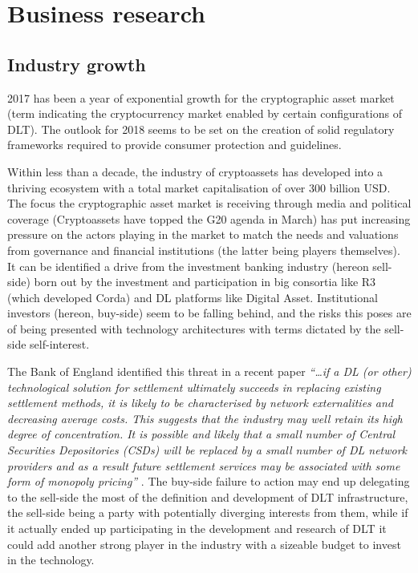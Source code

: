 \chapter{Business research}
\label{chap:business-analysis}

\section{Industry growth}

2017 has been a year of exponential growth for the cryptographic asset market (term indicating the cryptocurrency market enabled by certain configurations of DLT). The outlook for 2018 seems to be set on the creation of solid regulatory frameworks required to provide consumer protection and guidelines.

Within less than a decade, the industry of cryptoassets has developed into a thriving ecosystem with a total market capitalisation of over 300 billion USD.
The focus the cryptographic asset market is receiving through media and political coverage (Cryptoassets have topped the G20 agenda in March) has put increasing pressure on the actors playing in the market to match the needs and valuations from governance and financial institutions (the latter being players themselves).\\

It can be identified a drive from the investment banking industry (hereon sell-side) born out by the investment and participation in big consortia like R3 (which developed Corda) and DL platforms like Digital Asset. Institutional investors (hereon, buy-side) seem to be falling behind, and the risks this poses are of being presented with technology architectures with terms dictated by the sell-side self-interest.

The Bank of England identified this threat in a recent paper \textit{“…if a DL (or other) technological solution for settlement ultimately succeeds in replacing existing settlement methods,
it is likely to be characterised by network externalities and decreasing average costs. This suggests that the industry may well retain its high degree of concentration. It is possible and likely that a small number of Central Securities Depositories (CSDs) will be replaced by a small number of DL network providers and as a result future settlement services may be associated with some form of monopoly pricing”} \cite{bankofenglandreport}. The buy-side failure to action may end up delegating to the sell-side the most of the definition and development of DLT infrastructure, the sell-side being a party with potentially diverging interests from them, while if it actually ended up participating in the development and research of DLT it could add another strong player in the industry with a sizeable budget to invest in the technology.

